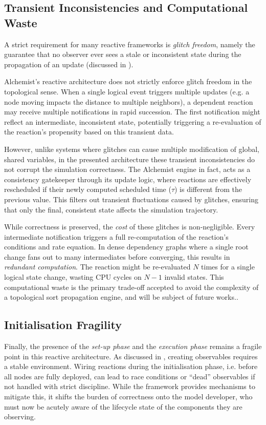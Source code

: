 \subsection{Transient Inconsistencies and Computational Waste}
A strict requirement for many reactive frameworks is \emph{glitch freedom},
namely the guarantee that no observer ever sees a stale or inconsistent state
during the propagation of an update (discussed in ).

Alchemist's reactive architecture does not strictly enforce glitch freedom in
the topological sense. When a single logical event triggers multiple updates
(e.g. a node moving impacts the distance to multiple neighbors), a dependent
reaction may receive multiple notifications in rapid succession. The first
notification might reflect an intermediate, inconsistent state, potentially
triggering a re-evaluation of the reaction's propensity based on this transient
data.

However, unlike systems where glitches can cause multiple modification of
global, shared variables, in the presented architecture these transient
inconsistencies do not corrupt the simulation correctness. The Alchemist engine
in fact, acts as a consistency gatekeeper through its update logic, where
reactions are effectively rescheduled if their newly computed scheduled time
($\tau$) is different from the previous value. This filters out transient
fluctuations caused by glitches, ensuring that only the final, consistent state
affects the simulation trajectory.

While correctness is preserved, the \emph{cost} of these glitches is
non-negligible. Every intermediate notification triggers a full re-computation
of the reaction's conditions and rate equation. In dense dependency graphs
where a single root change fans out to many intermediates before converging,
this results in \emph{redundant computation}. The reaction might be
re-evaluated $N$ times for a single logical state change, wasting CPU cycles on
$N-1$ invalid states. This computational waste is the primary trade-off
accepted to avoid the complexity of a topological sort propagation engine, and
will be subject of future works..

\subsection{Initialisation Fragility}
Finally, the presence of the \emph{set-up phase} and the \emph{execution phase}
remains a fragile point in this reactive architecture. As discussed in
, creating observables requires a stable
environment. Wiring reactions during the initialisation phase, i.e. before all
nodes are fully deployed, can lead to race conditions or ``dead'' observables
if not handled with strict discipline. While the framework provides mechanisms
to mitigate this, it shifts the burden of correctness onto the model developer,
who must now be acutely aware of the lifecycle state of the components they are
observing.

